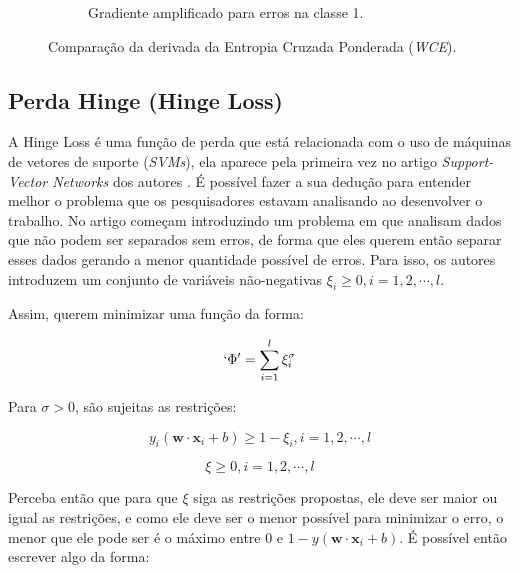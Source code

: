 \begin{figure}[h!]
\begin{subfigure}[b]{0.48\textwidth}
        \caption{Gradiente amplificado para erros na classe 1.}
        \label{fig:wce-derivada-alpha1}
    \end{subfigure}
    
    \caption{Comparação da derivada da Entropia Cruzada Ponderada (\textit{WCE}).}
    \label{fig:binary-weighted-cross-entropy-derivada-comparacao}
\end{figure}

\subsection{Perda Hinge (Hinge Loss)}

A Hinge Loss é uma função de perda que está relacionada com o uso de máquinas de vetores de suporte (\textit{SVMs}), ela aparece pela primeira vez no artigo \textit{Support-Vector Networks} dos autores \textcite{HingeLoss}. É possível fazer a sua dedução para entender melhor o problema que os pesquisadores estavam analisando ao desenvolver o trabalho. No artigo \textcite{HingeLoss} começam introduzindo um problema em que analisam dados que não podem ser separados sem erros, de forma que eles querem então separar esses dados gerando a menor quantidade possível de erros. Para isso, os autores introduzem um conjunto de variáveis não-negativas $\xi_i \ge 0, i = 1, 2, \cdots, l$. 

Assim, \textcite{HingeLoss} querem minimizar uma função da forma:

\[
    `\Phi ' = \sum_{i = 1}^l \xi_i^{\sigma}
\]

Para $\sigma > 0$, são sujeitas as restrições:

\[
    y_i (\textbf{w} \cdot \textbf{x}_i + b) \ge 1 - \xi_i, i = 1, 2, \cdots, l
\]

\[
    \xi \ge 0, i = 1, 2, \cdots, l
\]

Perceba então que para que $\xi$ siga as restrições propostas, ele deve ser maior ou igual as restrições, e como ele deve ser o menor possível para minimizar o erro, o menor que ele pode ser é o máximo entre 0 e $1 - y(\textbf{w} \cdot \textbf{x}_i + b)$. É possível então escrever algo da forma:

